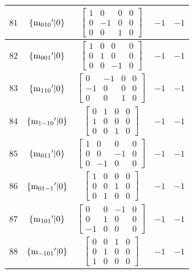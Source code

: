 \documentclass[fleqn,8pt]{jsarticle}
\begin{document}
\begin{longtable}{ccccc}
$ 81 $ & $ \{{\rm m}_{010}{}'|0\} $ & $ \begin{bmatrix} 1 & 0 & 0 & 0 \\ 0 & -1 & 0 & 0 \\ 0 & 0 & 1 & 0 \end{bmatrix} $ & $ -1 $ & $ -1 $ \\ \hline
$ 82 $ & $ \{{\rm m}_{001}{}'|0\} $ & $ \begin{bmatrix} 1 & 0 & 0 & 0 \\ 0 & 1 & 0 & 0 \\ 0 & 0 & -1 & 0 \end{bmatrix} $ & $ -1 $ & $ -1 $ \\ \hline
$ 83 $ & $ \{{\rm m}_{110}{}'|0\} $ & $ \begin{bmatrix} 0 & -1 & 0 & 0 \\ -1 & 0 & 0 & 0 \\ 0 & 0 & 1 & 0 \end{bmatrix} $ & $ -1 $ & $ -1 $ \\ \hline
$ 84 $ & $ \{{\rm m}_{1-10}{}'|0\} $ & $ \begin{bmatrix} 0 & 1 & 0 & 0 \\ 1 & 0 & 0 & 0 \\ 0 & 0 & 1 & 0 \end{bmatrix} $ & $ -1 $ & $ -1 $ \\ \hline
$ 85 $ & $ \{{\rm m}_{011}{}'|0\} $ & $ \begin{bmatrix} 1 & 0 & 0 & 0 \\ 0 & 0 & -1 & 0 \\ 0 & -1 & 0 & 0 \end{bmatrix} $ & $ -1 $ & $ -1 $ \\ \hline
$ 86 $ & $ \{{\rm m}_{01-1}{}'|0\} $ & $ \begin{bmatrix} 1 & 0 & 0 & 0 \\ 0 & 0 & 1 & 0 \\ 0 & 1 & 0 & 0 \end{bmatrix} $ & $ -1 $ & $ -1 $ \\ \hline
$ 87 $ & $ \{{\rm m}_{101}{}'|0\} $ & $ \begin{bmatrix} 0 & 0 & -1 & 0 \\ 0 & 1 & 0 & 0 \\ -1 & 0 & 0 & 0 \end{bmatrix} $ & $ -1 $ & $ -1 $ \\ \hline
$ 88 $ & $ \{{\rm m}_{-101}{}'|0\} $ & $ \begin{bmatrix} 0 & 0 & 1 & 0 \\ 0 & 1 & 0 & 0 \\ 1 & 0 & 0 & 0 \end{bmatrix} $ & $ -1 $ & $ -1 $ \\ \hline

\end{longtable}
\end{document}
